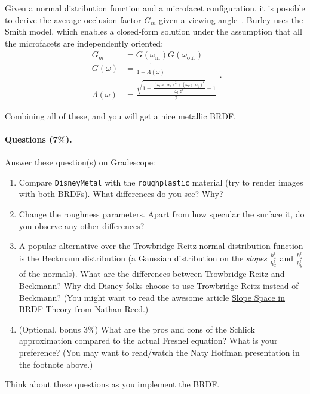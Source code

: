 Given a normal distribution function and a microfacet configuration, it is possible to derive the average occlusion factor $G_m$ given a viewing angle~\cite{Heitz:2014:UMF}. Burley uses the Smith model, which enables a closed-form solution under the assumption that all the microfacets are independently oriented:
\begin{equation}
\begin{aligned}
G_m &= G(\omega_{\text{in}}) G(\omega_{\text{out}}) \\
G(\omega) &= \frac{1}{1 + \Lambda(\omega)} \\
\Lambda(\omega) &= \frac{\sqrt{1 + \frac{\left(\omega_l.x \cdot \alpha_x\right)^2 + \left(\omega_l.y \cdot \alpha_y\right)^2}{\omega_l.z^2}} - 1}{2}
\end{aligned}.
\end{equation}

Combining all of these, and you will get a nice metallic BRDF.

\paragraph{Questions (7\%).} Answer these question(s) on Gradescope:
\begin{enumerate}
    \item Compare \lstinline{DisneyMetal} with the \lstinline{roughplastic} material (try to render images with both BRDFs). What differences do you see? Why?
    \item Change the roughness parameters. Apart from how specular the surface it, do you observe any other differences?
    \item A popular alternative over the Trowbridge-Reitz normal distribution function is the Beckmann distribution (a Gaussian distribution on the \emph{slopes} $\frac{h_z^l}{h_x^l}$ and $\frac{h_z^l}{h_y^l}$ of the normals). What are the differences between Trowbridge-Reitz and Beckmann? Why did Disney folks choose to use Trowbridge-Reitz instead of Beckmann? (You might want to read the awesome article \href{https://www.reedbeta.com/blog/slope-space-in-brdf-theory/}{Slope Space in BRDF Theory} from Nathan Reed.)
    \item (Optional, bonus 3\%) What are the pros and cons of the Schlick approximation compared to the actual Fresnel equation? What is your preference? (You may want to read/watch the Naty Hoffman presentation in the footnote above.)
\end{enumerate}
Think about these questions as you implement the BRDF.

